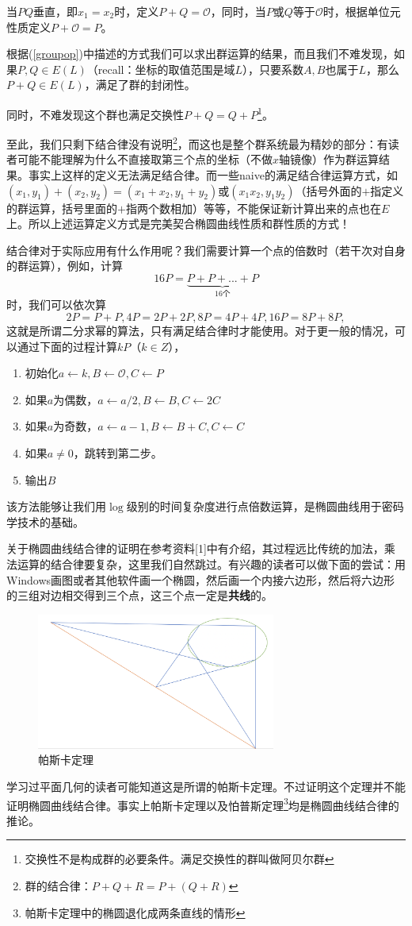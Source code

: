 \documentclass[12pt]{article}
\newcommand{\ec}{椭圆曲线}
\newcommand{\oo}{\mathcal{O}}
\begin{document}
当$PQ$垂直，即$x_1=x_2$时，定义$P+Q=\oo$，同时，当$P$或$Q$等于$\oo$时，根据单位元性质定义$P+\oo=P$。

根据(\ref{groupop})中描述的方式我们可以求出群运算的结果，而且我们不难发现，如果$P,Q\in E(L)$（recall：坐标的取值范围是域$L$），只要系数$A,B$也属于$L$，那么$P+Q \in E(L)$，满足了群的封闭性。

同时，不难发现这个群也满足交换性$P+Q=Q+P$\footnote{交换性不是构成群的必要条件。满足交换性的群叫做阿贝尔群}。

至此，我们只剩下结合律没有说明\footnote{群的结合律：$P+Q+R=P+(Q+R)$}，而这也是整个群系统最为精妙的部分：有读者可能不能理解为什么不直接取第三个点的坐标（不做$x$轴镜像）作为群运算结果。事实上这样的定义无法满足结合律。而一些naive的满足结合律运算方式，如$(x_1,y_1)+(x_2,y_2) = (x_1+x_2,y_1+y_2)$或$(x_1x_2,y_1y_2)$（括号外面的$+$指定义的群运算，括号里面的$+$指两个数相加）等等，不能保证新计算出来的点也在$E$上。所以上述运算定义方式是完美契合椭圆曲线性质和群性质的方式！

结合律对于实际应用有什么作用呢？我们需要计算一个点的倍数时（若干次对自身的群运算），例如，计算
$$16P=\underbrace{P+P+...+P}_{16\mbox{个}}$$
时，我们可以依次算
$$2P=P+P,4P=2P+2P,8P=4P+4P,16P=8P+8P,$$
这就是所谓二分求幂的算法，只有满足结合律时才能使用。对于更一般的情况，可以通过下面的过程计算$kP$（$k \in Z$），
\begin{enumerate}
	\item 初始化$a\leftarrow k, B \leftarrow \oo, C \leftarrow P$
	\item 如果$a$为偶数，$a \leftarrow a/2, B \leftarrow B, C \leftarrow 2C$
	\item 如果$a$为奇数，$a \leftarrow a-1, B \leftarrow B+C, C \leftarrow C$
	\item 如果$a \neq 0$，跳转到第二步。
	\item 输出$B$
\end{enumerate}
该方法能够让我们用$\log$级别的时间复杂度进行点倍数运算，是\ec 用于密码学技术的基础。

关于椭圆曲线结合律的证明在参考资料[1]中有介绍，其过程远比传统的加法，乘法运算的结合律要复杂，这里我们自然跳过。有兴趣的读者可以做下面的尝试：用Windows画图或者其他软件画一个椭圆，然后画一个内接六边形，然后将六边形的三组对边相交得到三个点，这三个点一定是\textbf{共线}的。
\begin{figure}[H]
	\centering
	\label{fig:pascal}
	\includegraphics[width=0.7\textwidth]{../common/pascal.png}
	\caption{帕斯卡定理}
\end{figure}
学习过平面几何的读者可能知道这是所谓的帕斯卡定理。不过证明这个定理并不能证明椭圆曲线结合律。事实上帕斯卡定理以及怕普斯定理\footnote{帕斯卡定理中的椭圆退化成两条直线的情形}均是椭圆曲线结合律的推论。
\end{document}
